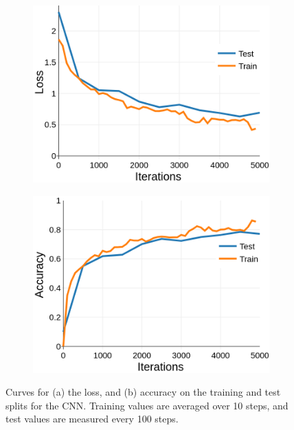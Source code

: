 \documentclass{article}
\begin{document}
\begin{figure}[t]
\begin{subfigure}{0.49\textwidth}
\centering
\includegraphics[scale=0.22]{img/convnet-loss}
\caption{}
\end{subfigure}
\begin{subfigure}{0.49\textwidth}
\centering
\includegraphics[scale=0.22]{img/convnet-acc}
\caption{}
\end{subfigure}
 \caption{Curves for (a) the loss, and (b) accuracy on the training and test splits for the CNN. Training values are averaged over 10 steps, and test values are measured every 100 steps.}
\label{fig:convnet_curves}
\end{figure}



\end{document}

